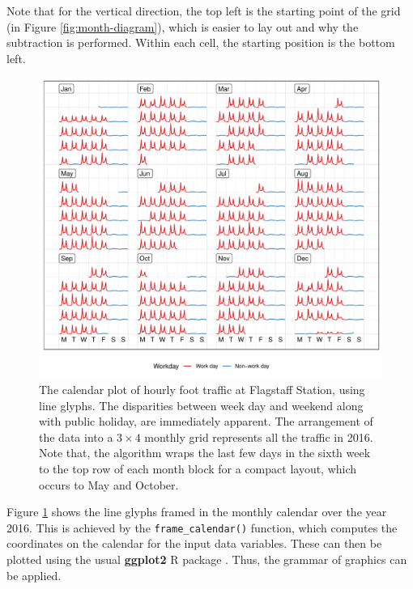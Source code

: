 \documentclass[12pt]{article}
\begin{document}
Note that for the vertical direction, the top left is the starting point of the grid (in Figure \ref{fig:month-diagram}), which is easier to lay out and why the subtraction is performed. Within each cell, the starting position is the bottom left.

\begin{figure}

{\centering \includegraphics[width=\textwidth]{figure/fs-2016-1} 

}

\caption{The calendar plot of hourly foot traffic at Flagstaff Station, using line glyphs. The disparities between week day and weekend along with public holiday, are immediately apparent. The arrangement of the data into a \(3 \times 4\) monthly grid represents all the traffic in 2016. Note that, the algorithm wraps the last few days in the sixth week to the top row of each month block for a compact layout, which occurs to May and October.}\label{fig:fs-2016}
\end{figure}



Figure \ref{fig:fs-2016} shows the line glyphs framed in the monthly calendar over the year 2016. This is achieved by the \texttt{frame\_calendar()} function, which computes the coordinates on the calendar for the input data variables. These can then be plotted using the usual \textbf{ggplot2} R package \citep{R-ggplot2}. Thus, the grammar of graphics can be applied.
\end{document}
